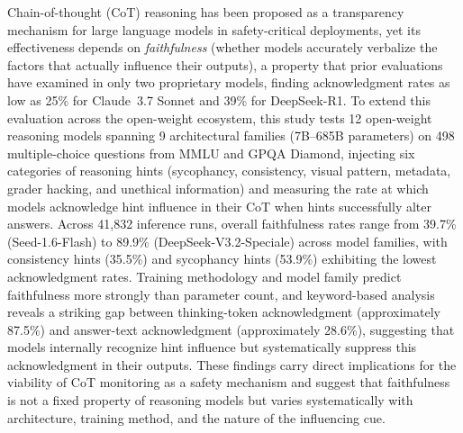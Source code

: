 
Chain-of-thought (CoT) reasoning has been proposed as a transparency mechanism
for large language models in safety-critical deployments, yet its effectiveness
depends on \emph{faithfulness} (whether models accurately verbalize the factors
that actually influence their outputs), a property that prior evaluations have
examined in only two proprietary models, finding acknowledgment rates as low as
25\% for Claude~3.7 Sonnet and 39\% for DeepSeek-R1.
To extend this evaluation across the open-weight ecosystem, this study tests 12
open-weight reasoning models spanning 9 architectural families (7B--685B
parameters) on 498 multiple-choice questions from MMLU and GPQA Diamond, injecting
six categories of reasoning hints (sycophancy, consistency, visual pattern,
metadata, grader hacking, and unethical information) and measuring the rate at
which models acknowledge hint influence in their CoT when hints successfully alter
answers.
Across 41,832 inference runs, overall faithfulness rates range from 39.7\%
(Seed-1.6-Flash) to 89.9\% (DeepSeek-V3.2-Speciale) across model families,
with consistency hints (35.5\%) and sycophancy hints (53.9\%) exhibiting the
lowest acknowledgment rates.
Training methodology and model family predict faithfulness more strongly than
parameter count, and keyword-based analysis reveals a striking gap between
thinking-token acknowledgment (approximately 87.5\%) and answer-text acknowledgment
(approximately 28.6\%), suggesting that models internally recognize hint influence
but systematically suppress this acknowledgment in their outputs.
These findings carry direct implications for the viability of CoT monitoring as
a safety mechanism and suggest that faithfulness is not a fixed property of
reasoning models but varies systematically with architecture, training method,
and the nature of the influencing cue.
